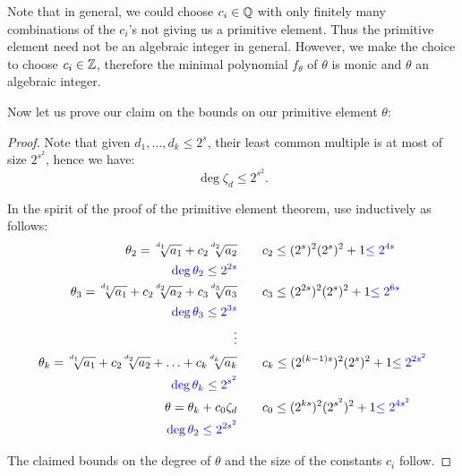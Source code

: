 Note that in general, we could choose $c_i\in\mathbb{Q}$ with only finitely many combinations of the $c_i$'s not giving us a primitive element. Thus the primitive element need not be an algebraic integer in general. However, we make the choice to choose $c_i\in\mathbb{Z}$, therefore the minimal polynomial $f_\theta$ of $\theta$ is monic and $\theta$ an algebraic integer.

Now let us prove our claim on the bounds on our primitive element $\theta$:
\boundprimitiveelement*

\begin{proof}
Note that given $d_1,\ldots,d_k \leq 2^s$, their least common multiple is at most of size $2^{s^2}$, hence we have:
\[ \deg \zeta_d \leq  2^{s^2}.  \]

In the spirit of the proof of the primitive element theorem, use  inductively as follows:
\begin{align*}
    \theta_2 = \mysqrt{d_1}{a_1} + c_2\mysqrt{d_2}{a_2} &\qquad c_2 \leq (2^s)^2(2^s)^2 + 1 \textcolor{blue}{\leq 2^{4s}} \\
    \textcolor{blue}{\deg \theta_2 \leq 2^{2s}} \\
    \theta_3 = \mysqrt{d_1}{a_1} + c_2\mysqrt{d_2}{a_2} + c_3\mysqrt{d_3}{a_3}  &\qquad c_3 \leq (2^{2s})^2(2^s)^2 + 1 \textcolor{blue}{\leq 2^{6s}} \\
    \textcolor{blue}{\deg \theta_3 \leq 2^{3s}} \\
    \vdots & \\
    \theta_k = \mysqrt{d_1}{a_1} + c_2\mysqrt{d_2}{a_2} + \ldots + c_k\mysqrt{d_k}{a_k} &\qquad c_k \leq (2^{(k-1)s})^2(2^s)^2 + 1 \textcolor{blue}{\leq 2^{2s^2}}\\
    \textcolor{blue}{\deg \theta_k \leq 2^{s^2}} \\
    \theta = \theta_k + c_0 \zeta_d &\qquad c_0 \leq (2^{ks})^2(2^{s^2})^2 + 1 \textcolor{blue}{\leq 2^{4s^2}}\\
    \textcolor{blue}{\deg \theta_2 \leq 2^{2s^2}} \\
\end{align*}

The claimed bounds on the degree of $\theta$ and the size of the constants $c_i$ follow.
\end{proof}